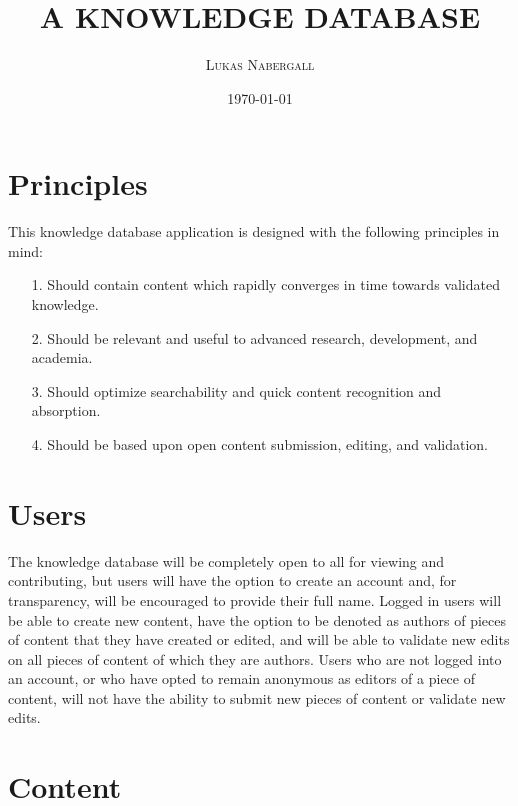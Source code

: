 \documentclass[12pt,letterpaper]{article}
\begin{document}
\title{\uppercase{\textbf{\normalsize A Knowledge Database}}}
\author{\small{\textsc{Lukas Nabergall}}}
\date{\small{\textsc{\today}}}
\maketitle

\section{Principles}

This knowledge database application is designed with the following principles in mind:
\begin{enumerate}
\item[1.] Should contain content which rapidly converges in time towards validated knowledge. 
\item[2.] Should be relevant and useful to advanced research, development, and academia.
\item[3.] Should optimize searchability and quick content recognition and absorption.
\item[4.] Should be based upon open content submission, editing, and validation.
\end{enumerate}


\section{Users}

The knowledge database will be completely open to all for viewing and contributing, but users will have the option to create an account and, for transparency, will be encouraged to provide their full name. Logged in users will be able to create new content, have the option to be denoted as authors of pieces of content that they have created or edited, and will be able to validate new edits on all pieces of content of which they are authors. Users who are not logged into an account, or who have opted to remain anonymous as editors of a piece of content, will not have the ability to submit new pieces of content or validate new edits. 


\section{Content}
\end{document}
